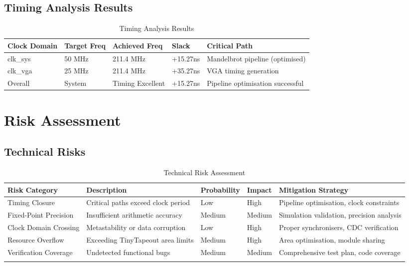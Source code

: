 \documentclass[11pt,a4paper]{article}
\begin{document}
\subsection{Timing Analysis Results}
\begin{table}[h]
\centering
\begin{tabularx}{\textwidth}{|l|l|l|l|X|}
\hline
\rowcolor{darkgreen!20}
\textbf{Clock Domain} & \textbf{Target Freq} & \textbf{Achieved Freq} & \textbf{Slack} & \textbf{Critical Path} \\
\hline
clk\_sys & 50 MHz & 211.4 MHz & +15.27ns & Mandelbrot pipeline (optimised) \\
clk\_vga & 25 MHz & 211.4 MHz & +35.27ns & VGA timing generation \\
Overall & System & Timing Excellent & +15.27ns & Pipeline optimisation successful \\
\hline
\end{tabularx}
\caption{Timing Analysis Results}
\end{table}

\newpage
\section{Risk Assessment}

\subsection{Technical Risks}
\begin{longtable}{|p{2cm}|p{2.5cm}|p{1.5cm}|p{1.5cm}|p{3.5cm}|}
\hline
\rowcolor{darkred!20}
\textbf{Risk Category} & \textbf{Description} & \textbf{Probability} & \textbf{Impact} & \textbf{Mitigation Strategy} \\
\hline
Timing Closure & Critical paths exceed clock period & Low & High & Pipeline optimisation, clock constraints \\
\hline
Fixed-Point Precision & Insufficient arithmetic accuracy & Medium & Medium & Simulation validation, precision analysis \\
\hline
Clock Domain Crossing & Metastability or data corruption & Low & High & Proper synchronisers, CDC verification \\
\hline
Resource Overflow & Exceeding TinyTapeout area limits & Medium & High & Area optimisation, module sharing \\
\hline
Verification Coverage & Undetected functional bugs & Medium & Medium & Comprehensive test plan, code coverage \\
\hline
\caption{Technical Risk Assessment}
\end{longtable}
\end{document}
